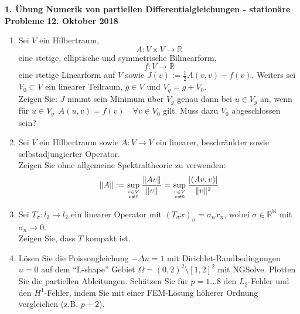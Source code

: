 \documentclass[11pt,a4paper]{report}
\begin{document}
\begin{center}
\textbf{1. \"Ubung Numerik von partiellen Differentialgleichungen - station\"are Probleme} \newline 
\textbf{12. Oktober 2018}
\end{center}
\begin{enumerate}



\item Sei $V$ ein Hilbertraum, 
$$A: V \times V \rightarrow \mathbb{R} $$
eine stetige, elliptische und symmetrische Bilinearform, 
$$ f: V \rightarrow \mathbb{R}$$ eine stetige Linearform auf $V$ sowie $J(v):= \frac{1}{2}A(v,v)-f(v) $. Weiters sei $V_0 \subset V$ ein linearer Teilraum, $g \in V$ und $V_g = g + V_0$. 
\\
Zeigen Sie: $J$ nimmt sein Minimum \"uber $V_g$ genau dann bei $u \in V_g$ an, wenn f\"ur $u\in V_g\,$ $A(u,v)=f(v) \quad \forall v\in V_0$ gilt. Muss dazu $V_0$ abgeschlossen sein?
\vspace{15pt}



\item Sei $V$ ein Hilbertraum sowie $A: V \rightarrow V$ ein linearer, beschr\"ankter sowie selbstadjungierter Operator. \\ Zeigen Sie ohne allgemeine Spektraltheorie zu verwenden:\\
$$ \| A\| := \sup\limits_{v \in V \atop v\neq 0} \frac{\|Av \|}{\| v \|} = \sup\limits_{v\in V\atop v\neq 0} \frac{|(Av,v)|}{\|v\|^2}$$
\vspace{15pt}



\item Sei $T_\sigma:l_2 \rightarrow l_2$ ein linearer Operator mit $(T_\sigma x)_n = \sigma_n x_n$, wobei $\sigma\in \mathbb{R}^{\mathbb{N}}$ mit $\sigma_n\rightarrow 0$.
\\ Zeigen Sie, dass $T$ kompakt ist.
\vspace{15pt}


\item L\"osen Sie die Poissongleichung $-\Delta u = 1$ mit
  Dirichlet-Randbedingungen $u=0$ auf dem ``L-shape'' Gebiet $\Omega =
  (0,2)^2 \setminus [1,2]^2$ mit NGSolve. Plotten Sie die partiellen
  Ableitungen. Sch\"atzen Sie f\"ur $p=1 \ldots 8$ den $L_2$-Fehler und den
  $H^1$-Fehler, indem Sie mit einer FEM-L\"osung h\"oherer Ordnung
  vergleichen (z.B. $p+2$). 

\end{enumerate}
\end{document}
